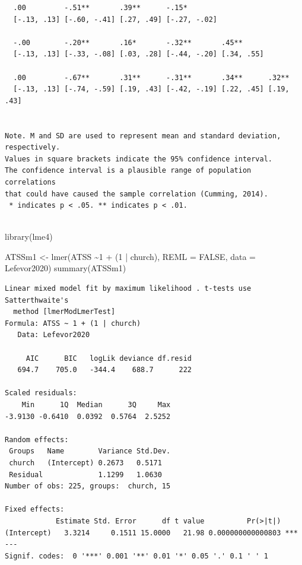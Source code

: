 \documentclass[
  11pt,
]{book}
\newenvironment{Shaded}{\begin{snugshade}}{\end{snugshade}}
\newcommand{\AttributeTok}[1]{\textcolor[rgb]{0.77,0.63,0.00}{#1}}
\newcommand{\ConstantTok}[1]{\textcolor[rgb]{0.00,0.00,0.00}{#1}}
\newcommand{\DecValTok}[1]{\textcolor[rgb]{0.00,0.00,0.81}{#1}}
\newcommand{\FunctionTok}[1]{\textcolor[rgb]{0.00,0.00,0.00}{#1}}
\newcommand{\NormalTok}[1]{#1}
\newcommand{\OtherTok}[1]{\textcolor[rgb]{0.56,0.35,0.01}{#1}}
\newcommand{\SpecialCharTok}[1]{\textcolor[rgb]{0.00,0.00,0.00}{#1}}
\begin{document}
\begin{verbatim}
  .00         -.51**       .39**      -.15*                             
  [-.13, .13] [-.60, -.41] [.27, .49] [-.27, -.02]                      
                                                                        
  -.00        -.20**       .16*       -.32**       .45**                
  [-.13, .13] [-.33, -.08] [.03, .28] [-.44, -.20] [.34, .55]           
                                                                        
  .00         -.67**       .31**      -.31**       .34**      .32**     
  [-.13, .13] [-.74, -.59] [.19, .43] [-.42, -.19] [.22, .45] [.19, .43]
                                                                        

Note. M and SD are used to represent mean and standard deviation, respectively.
Values in square brackets indicate the 95% confidence interval.
The confidence interval is a plausible range of population correlations 
that could have caused the sample correlation (Cumming, 2014).
 * indicates p < .05. ** indicates p < .01.
 
\end{verbatim}

\begin{Shaded}
\begin{Highlighting}[]
\FunctionTok{library}\NormalTok{(lme4)}

\NormalTok{ATSSm1 }\OtherTok{\textless{}{-}} \FunctionTok{lmer}\NormalTok{(ATSS }\SpecialCharTok{\textasciitilde{}}\DecValTok{1} \SpecialCharTok{+}\NormalTok{ (}\DecValTok{1} \SpecialCharTok{|}\NormalTok{ church), }\AttributeTok{REML =} \ConstantTok{FALSE}\NormalTok{, }\AttributeTok{data =}\NormalTok{ Lefevor2020)}
\FunctionTok{summary}\NormalTok{(ATSSm1)}
\end{Highlighting}
\end{Shaded}

\begin{verbatim}
Linear mixed model fit by maximum likelihood . t-tests use Satterthwaite's
  method [lmerModLmerTest]
Formula: ATSS ~ 1 + (1 | church)
   Data: Lefevor2020

     AIC      BIC   logLik deviance df.resid 
   694.7    705.0   -344.4    688.7      222 

Scaled residuals: 
    Min      1Q  Median      3Q     Max 
-3.9130 -0.6410  0.0392  0.5764  2.5252 

Random effects:
 Groups   Name        Variance Std.Dev.
 church   (Intercept) 0.2673   0.5171  
 Residual             1.1299   1.0630  
Number of obs: 225, groups:  church, 15

Fixed effects:
            Estimate Std. Error      df t value          Pr(>|t|)    
(Intercept)   3.3214     0.1511 15.0000   21.98 0.000000000000803 ***
---
Signif. codes:  0 '***' 0.001 '**' 0.01 '*' 0.05 '.' 0.1 ' ' 1
\end{verbatim}
\end{document}
